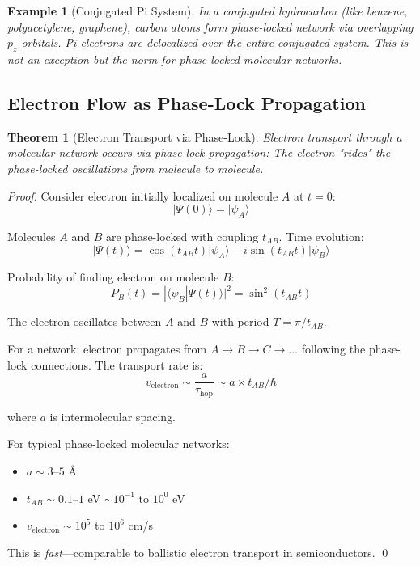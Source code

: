 \documentclass[12pt,a4paper]{article}
\newtheorem{theorem}{Theorem}
\newtheorem{example}{Example}
\begin{document}
\begin{example}[Conjugated Pi System]
In a conjugated hydrocarbon (like benzene, polyacetylene, graphene), carbon atoms form phase-locked network via overlapping $p_z$ orbitals. Pi electrons are delocalized over the entire conjugated system. This is not an exception but the \textit{norm} for phase-locked molecular networks.
\end{example}

\subsection{Electron Flow as Phase-Lock Propagation}

\begin{theorem}[Electron Transport via Phase-Lock]
\label{thm:electron_transport}
Electron transport through a molecular network occurs via \textit{phase-lock propagation}: The electron "rides" the phase-locked oscillations from molecule to molecule.
\end{theorem}

\begin{proof}
Consider electron initially localized on molecule $A$ at $t=0$:
\begin{equation}
|\Psi(0)\rangle = |\psi_A\rangle
\end{equation}

Molecules $A$ and $B$ are phase-locked with coupling $t_{AB}$. Time evolution:
\begin{equation}
|\Psi(t)\rangle = \cos(t_{AB} t) |\psi_A\rangle - i \sin(t_{AB} t) |\psi_B\rangle
\end{equation}

Probability of finding electron on molecule $B$:
\begin{equation}
P_B(t) = |\langle \psi_B | \Psi(t) \rangle|^2 = \sin^2(t_{AB} t)
\end{equation}

The electron oscillates between $A$ and $B$ with period $T = \pi/t_{AB}$.

For a network: electron propagates from $A \to B \to C \to \ldots$ following the phase-lock connections. The transport rate is:
\begin{equation}
v_{\text{electron}} \sim \frac{a}{\tau_{\text{hop}}} \sim a \times t_{AB} / \hbar
\end{equation}

where $a$ is intermolecular spacing.

For typical phase-locked molecular networks:
\begin{itemize}
\item $a \sim 3$--$5$ Å
\item $t_{AB} \sim 0.1$--$1$ eV $\sim 10^{-1}$ to $10^{0}$ eV
\item $v_{\text{electron}} \sim 10^5$ to $10^6$ cm/s
\end{itemize}

This is \textit{fast}—comparable to ballistic electron transport in semiconductors. \qed
\end{proof}
\end{document}
